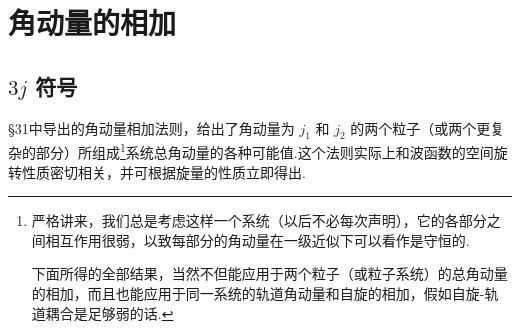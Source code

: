 %
%
\chapter{角动量的相加}

\section{\texorpdfstring{$3j$}{3j} 符号}

§31中导出的角动量相加法则，给出了角动量为 $j_1$ 和 $j_2$ 的两个粒子（或两个更复杂的部分）所组成\footnote{严格讲来，我们总是考虑这样一个系统（以后不必每次声明），它的各部分之间相互作用很弱，以致每部分的角动量在一级近似下可以看作是守恒的.\par 下面所得的全部结果，当然不但能应用于两个粒子（或粒子系统）的总角动量的相加，而且也能应用于同一系统的轨道角动量和自旋的相加，假如自旋-轨道耦合是足够弱的话.}系统总角动量的各种可能值.这个法则实际上和波函数的空间旋转性质密切相关，并可根据旋量的性质立即得出.


